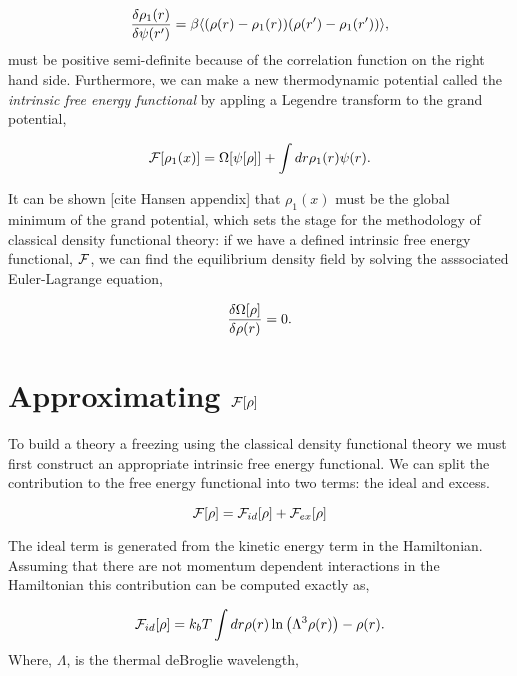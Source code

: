 \begin{equation}
    \frac{\delta \rho_1(r)}{\delta \psi(r^\prime)} = \beta \langle (\rho(r) - \rho_1(r))(\rho(r^\prime) - \rho_1(r^\prime)) \rangle, 
\end{equation}
must be positive semi-definite because of the correlation function on the right hand side. Furthermore, we can make a new thermodynamic potential called the \textit{intrinsic free energy functional} by appling a Legendre transform to the grand potential,

\begin{equation}
    \mathcal{F}[\rho_1(x)] = \Omega[\psi[\rho]] + \int dr \rho_1(r) \psi(r).
\end{equation}

It can be shown [cite Hansen appendix] that $\rho_1(x)$ must be the global minimum of the grand potential, which sets the stage for the methodology of classical density functional theory: if we have a defined intrinsic free energy functional, $\mathcal{F}$, we can find the equilibrium density field by solving the asssociated Euler-Lagrange equation, 

\begin{equation}
    \frac{\delta \Omega[\rho]}{\delta \rho(r)} = 0.
\end{equation}

\section{Approximating $\mathcal{F}[\rho]$}

To build a theory a freezing using the classical density functional theory we must first construct an appropriate intrinsic free energy functional. We can split the contribution to the free energy functional into two terms: the ideal and excess. 

\begin{equation}
    \mathcal{F}[\rho] = \mathcal{F}_{id}[\rho] + \mathcal{F}_{ex}[\rho]
\end{equation}

The ideal term is generated from the kinetic energy term in the Hamiltonian. Assuming that there are not momentum dependent interactions in the Hamiltonian this contribution can be computed exactly as, 

\begin{equation}
\mathcal{F}_{id}[\rho] = k_bT \int dr \rho(r) \ln\left(\Lambda^3\rho(r)\right) - \rho(r).
\end{equation}
Where, $\Lambda$, is the thermal deBroglie wavelength, 

